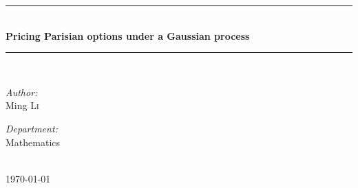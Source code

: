 \documentclass{ctexart} %
\begin{document}

\begin{titlepage}

\newcommand{\HRule}{\rule{\linewidth}{0.5mm}} %

\center %

\HRule \\[0.4cm]
{ \huge \bfseries Pricing Parisian options under a Gaussian process}\\[0.4cm] %
\HRule \\[1.5cm]

\begin{minipage}{0.4\textwidth}
\begin{flushleft} \large
\emph{Author:}\\
Ming \textsc{Li} %
\end{flushleft}
\end{minipage}
\begin{minipage}{0.4\textwidth}
\begin{flushright} \large
\emph{Department:} \\
Mathematics
\end{flushright}
\end{minipage}\\[4cm]

{\large \today}\\[3cm] %


\vfill %
\end{titlepage}
\newpage
\end{document}
